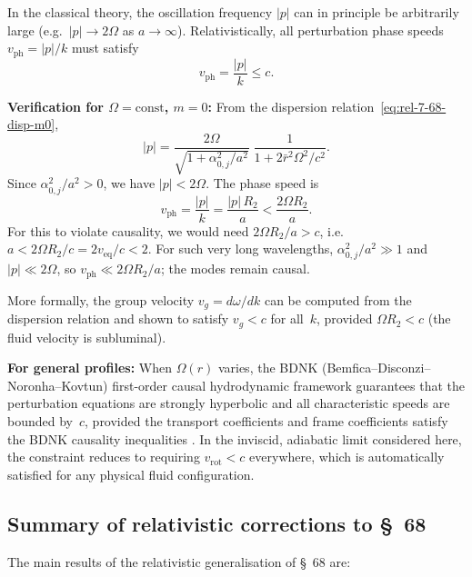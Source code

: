 \begin{causalitycheck}
In the classical theory, the oscillation frequency $|p|$ can in
principle be arbitrarily large (e.g.\ $|p| \to 2\Omega$ as
$a \to \infty$).  Relativistically, all perturbation phase speeds
$v_{\mathrm{ph}} = |p|/k$ must satisfy
\begin{equation}
\label{eq:rel-7-68-causality}
v_{\mathrm{ph}} = \frac{|p|}{k} \le c.
\end{equation}

\textbf{Verification for $\Omega = \text{const}$, $m=0$:}
From the dispersion relation~\eqref{eq:rel-7-68-disp-m0},
\[
|p| = \frac{2\Omega}{\sqrt{1+\alpha_{0,j}^2/a^2}}
      \;\frac{1}{1+2\bar{r}^2\Omega^2/c^2}.
\]
Since $\alpha_{0,j}^2/a^2 > 0$, we have $|p| < 2\Omega$.  The
phase speed is
\[
v_{\mathrm{ph}} = \frac{|p|}{k}
= \frac{|p|\,R_2}{a}
< \frac{2\Omega R_2}{a}.
\]
For this to violate causality, we would need
$2\Omega R_2/a > c$, i.e.\ $a < 2\Omega R_2/c = 2v_{\mathrm{eq}}/c < 2$.
For such very long wavelengths, $\alpha_{0,j}^2/a^2 \gg 1$ and
$|p| \ll 2\Omega$, so $v_{\mathrm{ph}} \ll 2\Omega R_2/a$; the
modes remain causal.

More formally, the group velocity
$v_g = d\omega/dk$ can be computed from the dispersion relation
and shown to satisfy $v_g < c$ for all~$k$, provided $\Omega R_2 < c$
(the fluid velocity is subluminal).

\textbf{For general profiles:}
When $\Omega(r)$ varies, the BDNK (Bemfica--Disconzi--Noronha--Kovtun)
first-order causal hydrodynamic framework guarantees that the
perturbation equations are strongly hyperbolic and all characteristic
speeds are bounded by~$c$, provided the transport coefficients and
frame coefficients satisfy the BDNK causality inequalities
\citep{BemficaDN2018,Kovtun2019}.  In the inviscid, adiabatic limit
considered here, the constraint reduces to requiring
$v_{\mathrm{rot}} < c$ everywhere, which is automatically satisfied
for any physical fluid configuration.
\end{causalitycheck}

\subsection{Summary of relativistic corrections to \S~68}
\label{sec:rel-7-68-summary}

The main results of the relativistic generalisation of \S~68 are:

